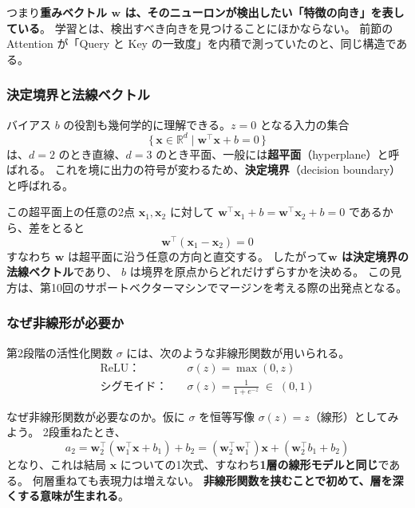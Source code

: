 つまり\textbf{重みベクトル $\bm{w}$ は、そのニューロンが検出したい「特徴の向き」を表している}。
学習とは、検出すべき向きを見つけることにほかならない。
前節の Attention が「Query と Key の一致度」を内積で測っていたのと、同じ構造である。

\subsubsection{決定境界と法線ベクトル}

バイアス $b$ の役割も幾何学的に理解できる。$z = 0$ となる入力の集合
\begin{equation}
  \{\, \bm{x} \in \mathbb{R}^d \mid \bm{w}^\top \bm{x} + b = 0 \,\}
\end{equation}
は、$d = 2$ のとき直線、$d = 3$ のとき平面、一般には\textbf{超平面}（hyperplane）と呼ばれる。
これを境に出力の符号が変わるため、\textbf{決定境界}（decision boundary）と呼ばれる。

この超平面上の任意の2点 $\bm{x}_1, \bm{x}_2$ に対して
$\bm{w}^\top \bm{x}_1 + b = \bm{w}^\top \bm{x}_2 + b = 0$ であるから、差をとると
\begin{equation}
  \bm{w}^\top (\bm{x}_1 - \bm{x}_2) = 0
\end{equation}
すなわち $\bm{w}$ は超平面に沿う任意の方向と直交する。
したがって\textbf{$\bm{w}$ は決定境界の法線ベクトル}であり、
$b$ は境界を原点からどれだけずらすかを決める。
この見方は、第10回のサポートベクターマシンでマージンを考える際の出発点となる。

\subsubsection{なぜ非線形が必要か}

第2段階の活性化関数 $\sigma$ には、次のような非線形関数が用いられる。
\begin{align}
  \text{ReLU：} \quad & \sigma(z) = \max(0, z) \\
  \text{シグモイド：} \quad & \sigma(z) = \frac{1}{1 + e^{-z}} \;\in\; (0, 1)
\end{align}

なぜ非線形関数が必要なのか。仮に $\sigma$ を恒等写像 $\sigma(z) = z$（線形）としてみよう。
2段重ねたとき、
\begin{equation}
  a_2 = \bm{w}_2^\top (\bm{w}_1^\top \bm{x} + b_1) + b_2
      = (\bm{w}_2^\top \bm{w}_1^\top) \bm{x} + (\bm{w}_2^\top b_1 + b_2)
\end{equation}
となり、これは結局 $\bm{x}$ についての1次式、すなわち\textbf{1層の線形モデルと同じ}である。
何層重ねても表現力は増えない。
\textbf{非線形関数を挟むことで初めて、層を深くする意味が生まれる}。

